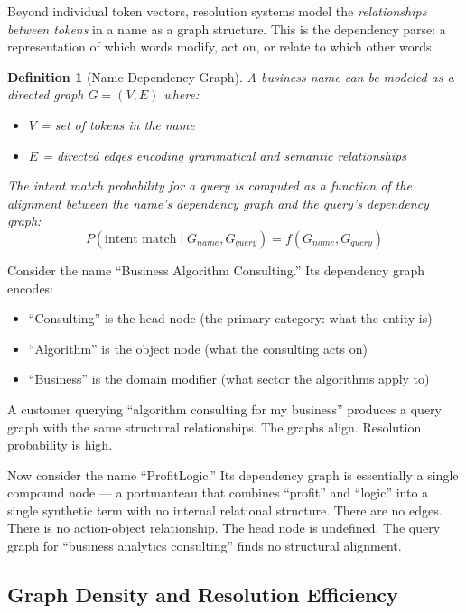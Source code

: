 \documentclass[12pt, openany]{book}
\theoremstyle{thmstyle}
\theoremstyle{defstyle}
\newtheorem{definition}{Definition}[chapter]
\begin{document}
Beyond individual token vectors, resolution systems model the \textit{relationships between tokens} in a name as a graph structure. This is the dependency parse: a representation of which words modify, act on, or relate to which other words.

\begin{definition}[Name Dependency Graph]
A business name can be modeled as a directed graph $G = (V, E)$ where:
\begin{itemize}[leftmargin=1.5em]
  \item $V$ = set of tokens in the name
  \item $E$ = directed edges encoding grammatical and semantic relationships
\end{itemize}
The intent match probability for a query is computed as a function of the alignment between the name's dependency graph and the query's dependency graph:
\[
P(\text{intent match} \mid G_{name}, G_{query}) = f(G_{name}, G_{query})
\]
\end{definition}

Consider the name ``Business Algorithm Consulting.'' Its dependency graph encodes:
\begin{itemize}[leftmargin=1.5em]
  \item ``Consulting'' is the head node (the primary category: what the entity is)
  \item ``Algorithm'' is the object node (what the consulting acts on)
  \item ``Business'' is the domain modifier (what sector the algorithms apply to)
\end{itemize}

A customer querying ``algorithm consulting for my business'' produces a query graph with the same structural relationships. The graphs align. Resolution probability is high.

Now consider the name ``ProfitLogic.'' Its dependency graph is essentially a single compound node --- a portmanteau that combines ``profit'' and ``logic'' into a single synthetic term with no internal relational structure. There are no edges. There is no action-object relationship. The head node is undefined. The query graph for ``business analytics consulting'' finds no structural alignment.

\subsection{Graph Density and Resolution Efficiency}
\end{document}
